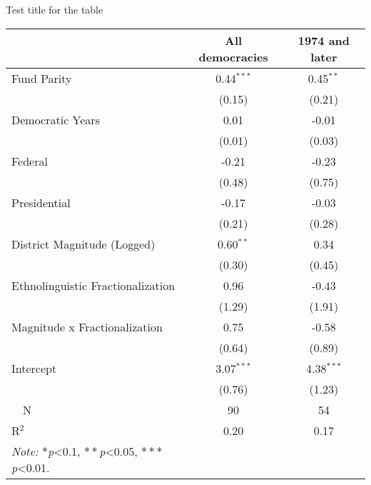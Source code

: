 \documentclass{beamer}
\begin{document}
\begin{frame} {Test title for the table}
	\begin{table}
	\centering
	\begin{tabular}{lcc}
		& All democracies & 1974 and later \\
		\hline\hline
			Fund Parity & 0.44$^{***}$ & 0.45$^{**}$ \\
			& (0.15) & (0.21) \\ 
			Democratic Years & 0.01 & -0.01 \\
			& (0.01) & (0.03) \\
			Federal &  -0.21 & -0.23 \\
			& (0.48) & (0.75) \\ 
			Presidential & -0.17 & -0.03 \\
			& (0.21) & (0.28) \\
			District Magnitude (Logged) & 0.60$^{**}$ & 0.34 \\
			& (0.30) & (0.45) \\
			Ethnolinguistic Fractionalization & 0.96 & -0.43 \\
			& (1.29) & (1.91) \\
			Magnitude x Fractionalization & 0.75 & -0.58 \\
			& (0.64) & (0.89) \\
			Intercept & 3.07$^{***}$ & 4.38$^{***}$ \\ 
			& (0.76) & (1.23) \\~\
			N & 90 & 54 \\ 
			R$^{2}$ & 0.20 & 0.17 \\ 
				\bottomrule
					\textit{Note:} ${*}$\emph{p}<0.1, ${**}$\emph{p}<0.05, ${***}$\emph{p}<0.01. 
					
		\end{tabular}
	\end{table}
\end{frame} 
\end{document}
